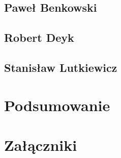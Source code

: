 \documentclass[a4paper,11pt]{report}
\begin{document}
\section {Paweł Benkowski}
\section {Robert Deyk}
\section {Stanisław Lutkiewicz}

\chapter {Podsumowanie}

\chapter {Załączniki}

 

\end{document}
